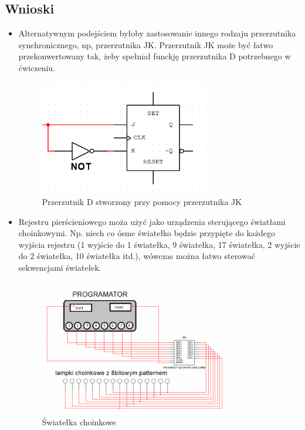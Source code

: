 \documentclass{article}
\begin{document}
\subsection{Wnioski}
\begin{itemize}
    \item
    Alternatywnym podejściem byłoby zastosowanie innego rodzaju przerzutnika synchronicznego, np, przerzutnika
    JK. Przerzutnik JK może być łatwo przekonwertowany tak, żeby spełniał funckję przerzutnika D potrzebnego w 
    ćwiczeniu.
    \begin{figure}[H]
        \centering
        \includegraphics[width=0.7\textwidth]{jk_alt.png}
        \caption{Przerzutnik D stworzony przy pomocy przerzutnika JK}
    \end{figure}
    \item
    Rejestru pierścieniowego moża użyć jako urządzenia sterującego światłami choinkowymi. Np. niech co ósme światełko
    będzie przypięte do każdego wyjścia rejestru (1 wyjście do 1 światełka, 9 światełka, 17 światełka, 2 wyjście do
    2 światełka, 10 światełka itd.), wówczas można łatwo sterować sekwencjami światełek.
    \begin{figure}[H]
        \centering
        \includegraphics[width=0.8\textwidth]{choink.png}
        \caption{Światełka choinkowe}
    \end{figure}

\end{itemize}
\end{document}
